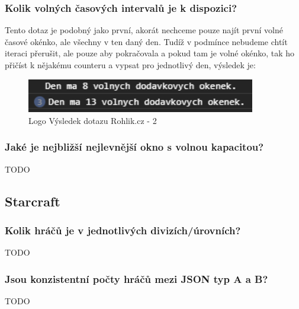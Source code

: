 \documentclass[a4, titlepage]{article}
\begin{document}
\subsubsection{Kolik volných časových intervalů je k dispozici?}
Tento dotaz je podobný jako první, akorát nechceme pouze najít první volné časové okénko, ale všechny v ten daný den. Tudíž v podmínce nebudeme chtít iteraci přerušit, ale pouze aby pokračovala a pokud tam je volné okénko, tak ho přičíst k nějakému counteru a vypsat pro jednotlivý den, výsledek je: 
\begin{figure}[h]
    \centering
    \includegraphics[width=10cm]{R2}
    \caption{Logo Výsledek dotazu Rohlik.cz - 2}
\end{figure}

\subsubsection{Jaké je nejbližší nejlevnější okno s volnou kapacitou?}
TODO

\subsection{Starcraft}
\subsubsection{Kolik hráčů je v jednotlivých divizích/úrovních?}
TODO

\subsubsection{Jsou konzistentní počty hráčů mezi JSON typ A a B?}
TODO
\end{document}
